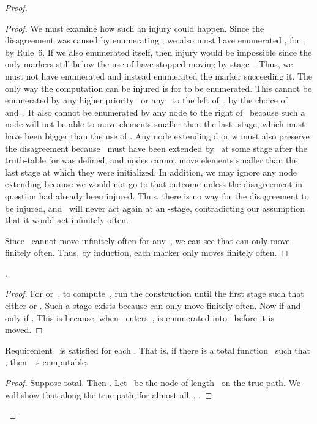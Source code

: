 \documentclass{LMCS}
\newcommand{\0}{\mathbf{0}}
\newcommand{\<}{\langle}
\renewcommand{\>}{\rangle}
\begin{document}
\begin{proof}
\begin{proof}
We must examine how such an injury could happen.  Since the disagreement was
caused by enumerating , we also must have enumerated
\mbox{,} for , by Rule~6.  If we also
enumerated  itself, then injury would be impossible since
the only markers still below the use of  have stopped moving by
stage~.  Thus, we must not have enumerated  and
instead enumerated the marker succeeding it.  The only way the computation
can be injured is for  to be enumerated. This cannot be
enumerated by any higher priority~ or any~ to the left
of~, by the choice of~ and~.  It also cannot be enumerated
by any node to the right of~ because such a node will not be able to
move elements smaller than the last -stage, which must have been
bigger than the use of .  Any node extending d or
w must also preserve the disagreement because~ must
have been extended by~ at some stage after the truth-table for
 was defined, and nodes cannot move elements smaller than the
last stage at which they were initialized.  In addition, we may ignore any
node extending  because we would not go to that outcome
unless the disagreement in question had already been injured.  Thus, there is
no way for the disagreement to be injured, and~ will never act
again at an -stage, contradicting our assumption that it would act
infinitely often.

Since~ cannot move  infinitely often for
any~, we can see that  can only move finitely often.
Thus, by induction, each marker only moves finitely often.
\end{proof}

\begin{lem}
.
\end{lem}

\begin{proof}
For  or~, to compute~, run the construction until the first
stage  such that either  or .  Such a stage exists because
 can only move finitely often.  Now  if and only if
.  This is because, when~ enters~,  is
enumerated into~ before it is moved.
\end{proof}

\begin{lem}\label{Satisfied}
Requirement~ is satisfied for each .  That is, if
there is a total function~ such that \mbox{,}
then~ is computable.
\end{lem}

\begin{proof}
Suppose  total.  Then .
Let~ be the node of length~ on the true path.   We will show that
along the true path, for almost all~, .


\end{proof}
\end{proof}
\end{document}
